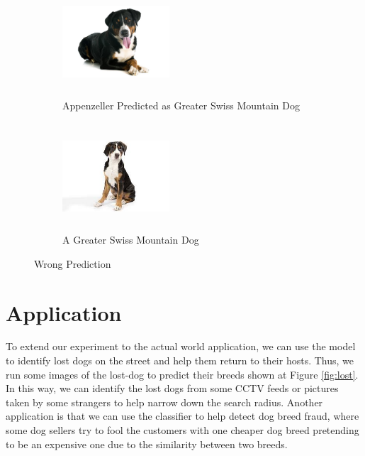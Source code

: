 \documentclass{article}
\begin{document}
\begin{figure}[h!]
    \centering
    \begin{subfigure}{.5\textwidth}
    \centering
    \includegraphics[width=4cm,height=4cm]{Appenzeller.jpg}
    \caption{Appenzeller Predicted as Greater Swiss Mountain Dog}
    \label{fig:husky}
    \end{subfigure}%
    \begin{subfigure}{.5\textwidth}
    \centering
    \includegraphics[width=4cm,height=4cm]{gsmd.jpg}
    \caption{A Greater Swiss Mountain Dog}
    \label{fig:rott}
    \end{subfigure}
    \caption{Wrong Prediction}
\label{fig:wrong_pred}
\end{figure}

\section{Application}
To extend our experiment to the actual world application, we can use the model to identify lost dogs on the street and help them return to their hosts. Thus, we run some images of the lost-dog to predict their breeds shown at Figure \ref{fig:lost}. In this way, we can identify the lost dogs from some CCTV feeds or pictures taken by some strangers to help narrow down the search radius. Another application is that we can use the classifier to help detect dog breed fraud, where some dog sellers try to fool the customers with one cheaper dog breed pretending to be an expensive one due to the similarity between two breeds.
\end{document}
